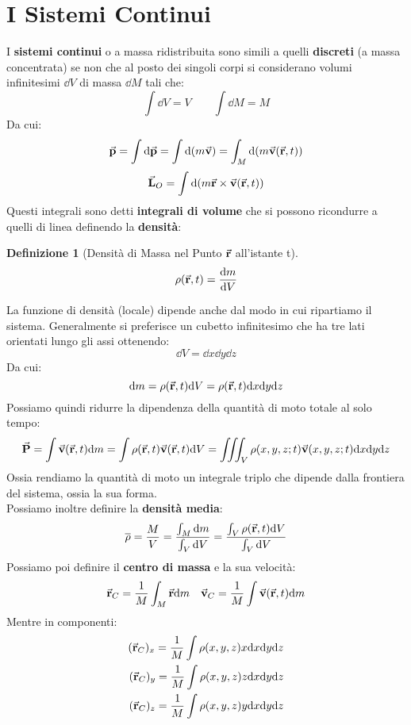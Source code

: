 \documentclass{article}
\newtheorem{defn}{Definizione}[section]
\newcommand{\note}{\noindent {\quad \bf \underline{Osservazione:}} \quad}
\renewcommand{\v}{\va{v}}
\renewcommand{\r}{\va{r}}
\newcommand{\p}{\va{p}}
\renewcommand{\P}{\va{P}}
\renewcommand{\L}{\va{L}}
\begin{document}
\section{I Sistemi Continui}
I \textbf{sistemi continui} o a massa ridistribuita sono simili a quelli \textbf{discreti} (a massa concentrata) se non che al posto dei singoli corpi si considerano volumi infinitesimi $\dd V$ di massa $\dd M$ tali che:
\[\int\dd V=V\quad\quad\int\dd M=M\]
Da cui:
\[\p=\int\dd\p=\int\dd(m\v)=\int_M\dd(m\v(\r,t))\]
\[\L_O=\int\dd(m\r\times\v(\r,t))\]
Questi integrali sono detti \textbf{integrali di volume} che si possono ricondurre a quelli di linea definendo la \textbf{densità}:
\begin{defn}[Densità di Massa nel Punto $\r$ all'istante t]
\begin{equation}
    \rho(\r,t)=\dv{m}{V}
\end{equation}
\end{defn}
\note La funzione di densità (locale) dipende anche dal modo in cui ripartiamo il sistema. Generalmente si preferisce un cubetto infinitesimo che ha tre lati orientati lungo gli assi ottenendo:
\[\dd V=\dd x\dd y\dd z\]
Da cui:
\[\dd m=\rho(\r,t)\dd V=\rho(\r,t)\dd x\dd y\dd z\]
Possiamo quindi ridurre la dipendenza della quantità di moto totale al solo tempo:
\[\P=\int\v(\r,t)\dd m=\int\rho(\r,t)\v(\r,t)\dd V=\iiint_V\rho(x,y,z;t)\v(x,y,z;t)\dd x\dd y\dd z\]
Ossia rendiamo la quantità di moto un integrale triplo che dipende dalla frontiera del sistema, ossia la sua forma.\\
Possiamo inoltre definire la \textbf{densità media}:
\begin{equation}
    \overline{\rho}=\frac{M}{V}=\frac{\int_M\dd m}{\int_V\dd V}=\frac{\int_V\rho(\r,t)\dd V}{\int_V\dd V}
\end{equation}
Possiamo poi definire il \textbf{centro di massa} e la sua velocità:
\begin{equation}
    \r_C=\frac{1}{M}\int_M\r\dd m\quad\v_C=\frac{1}{M}\int\v(\r,t)\dd m
\end{equation}
Mentre in componenti:
\begin{align*}
    (\r_C)_x=\frac{1}{M}\int\rho(x,y,z)x\dd x\dd y\dd z\\
    (\r_C)_y=\frac{1}{M}\int\rho(x,y,z)z\dd x\dd y\dd z\\
    (\r_C)_z=\frac{1}{M}\int\rho(x,y,z)y\dd x\dd y\dd z\\
\end{align*}
\end{document}
